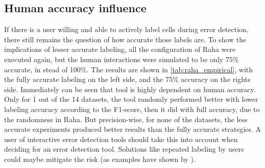 
\subsection{Human accuracy influence}
If there is a user willing and able to actively label cells during error detection, there still remains the question of how accurate those labels are. To show the implications of lesser accurate labeling, all the configuration of Raha were executed again, but the human interactions were simulated to be only 75\% accurate, in stead of 100\%. The results are shown in \autoref{tab:raha_empirical}, with the fully accurate labeling on the left side, and the 75\% accuracy on the rights side. Immediately can be seen that tool is highly dependent on human accuracy. Only for 1 out of the 14 datasets, the tool randomly performed better with lower labeling accuracy according to the F1-score, then it did with full accuracy, due to the randomness in Raha. But precision-wise, for none of the datasets, the less accurate experiments produced better results than the fully accurate strategies. A user of interactive error detection tools should take this into account when deciding for an error detection tool. Solutions like repeated labeling by users could maybe mitigate the risk (as examples have shown by \cite{Sheng2008-gk}).

